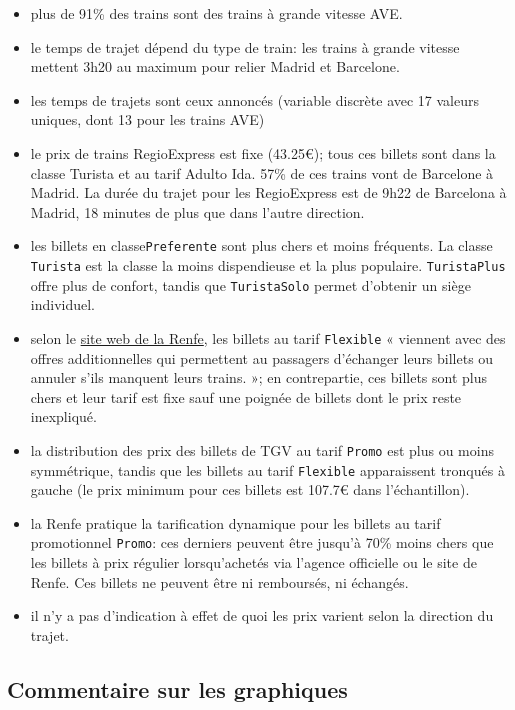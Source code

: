 \documentclass[
  11pt,
  letterpaper,
]{book}
\providecommand{\tightlist}{%
  \setlength{\itemsep}{0pt}\setlength{\parskip}{0pt}}
\theoremstyle{definition}
\theoremstyle{definition}
\theoremstyle{definition}
\theoremstyle{definition}
\theoremstyle{remark}
\begin{document}
\begin{itemize}
\tightlist
\item
  plus de 91\% des trains sont des trains à grande vitesse AVE.
\item
  le temps de trajet dépend du type de train: les trains à grande vitesse mettent 3h20 au maximum pour relier Madrid et Barcelone.
\item
  les temps de trajets sont ceux annoncés (variable discrète avec 17 valeurs uniques, dont 13 pour les trains AVE)
\item
  le prix de trains RegioExpress est fixe (43.25€); tous ces billets sont dans la classe Turista et au tarif Adulto Ida. 57\% de ces trains vont de Barcelone à Madrid. La durée du trajet pour les RegioExpress est de 9h22 de Barcelona à Madrid, 18 minutes de plus que dans l'autre direction.
\item
  les billets en classe\texttt{Preferente} sont plus chers et moins fréquents. La classe \texttt{Turista} est la classe la moins dispendieuse et la plus populaire. \texttt{TuristaPlus} offre plus de confort, tandis que \texttt{TuristaSolo} permet d'obtenir un siège individuel.
\item
  selon le \href{https://www.renfe.com/es/es/viajar/tarifas/billetes.html}{site web de la Renfe}, les billets au tarif \texttt{Flexible} « viennent avec des offres additionnelles qui permettent au passagers d'échanger leurs billets ou annuler s'ils manquent leurs trains. »; en contrepartie, ces billets sont plus chers et leur tarif est fixe sauf une poignée de billets dont le prix reste inexpliqué.
\item
  la distribution des prix des billets de TGV au tarif \texttt{Promo} est plus ou moins symmétrique, tandis que les billets au tarif \texttt{Flexible} apparaissent tronqués à gauche (le prix minimum pour ces billets est 107.7€ dans l'échantillon).
\item
  la Renfe pratique la tarification dynamique pour les billets au tarif promotionnel \texttt{Promo}: ces derniers peuvent être jusqu'à 70\% moins chers que les billets à prix régulier lorsqu'achetés via l'agence officielle ou le site de Renfe. Ces billets ne peuvent être ni remboursés, ni échangés.
\item
  il n'y a pas d'indication à effet de quoi les prix varient selon la direction du trajet.
\end{itemize}

\hypertarget{commentaire-sur-les-graphiques}{%
\subsection{Commentaire sur les graphiques}\label{commentaire-sur-les-graphiques}}
\end{document}
